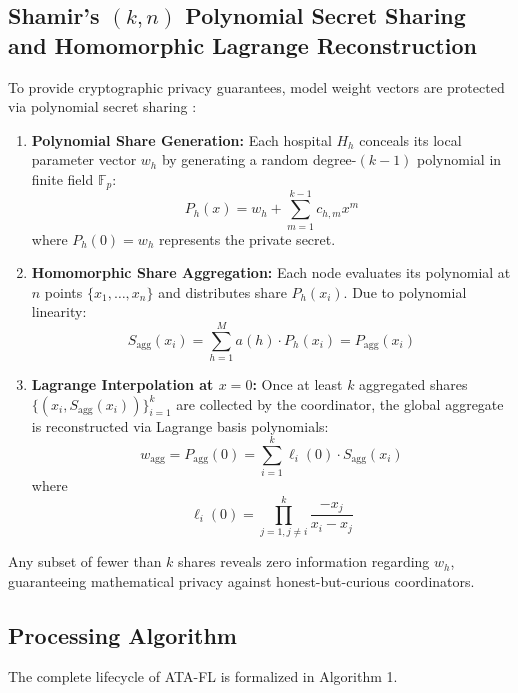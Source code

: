 \documentclass[conference]{IEEEtran}
\begin{document}
\subsection{Shamir's $(k, n)$ Polynomial Secret Sharing and Homomorphic Lagrange Reconstruction}
To provide cryptographic privacy guarantees, model weight vectors are protected via polynomial secret sharing \cite{shamir1979share}:
\begin{enumerate}
    \item \textbf{Polynomial Share Generation:} Each hospital $H_h$ conceals its local parameter vector $w_h$ by generating a random degree-$(k-1)$ polynomial in finite field $\mathbb{F}_p$:
    \begin{equation}
    P_h(x) = w_h + \sum_{m=1}^{k-1} c_{h, m} x^m
    \end{equation}
    where $P_h(0) = w_h$ represents the private secret.
    \item \textbf{Homomorphic Share Aggregation:} Each node evaluates its polynomial at $n$ points $\{x_1, \dots, x_n\}$ and distributes share $P_h(x_i)$. Due to polynomial linearity:
    \begin{equation}
    S_{\text{agg}}(x_i) = \sum_{h=1}^M a(h) \cdot P_h(x_i) = P_{\text{agg}}(x_i)
    \end{equation}
    \item \textbf{Lagrange Interpolation at $x = 0$:} Once at least $k$ aggregated shares $\{ (x_i, S_{\text{agg}}(x_i)) \}_{i=1}^k$ are collected by the coordinator, the global aggregate is reconstructed via Lagrange basis polynomials:
    \begin{equation}
    w_{\text{agg}} = P_{\text{agg}}(0) = \sum_{i=1}^k \ell_i(0) \cdot S_{\text{agg}}(x_i)
    \end{equation}
    where
    \begin{equation}
    \ell_i(0) = \prod_{j=1, j \neq i}^k \frac{-x_j}{x_i - x_j}
    \end{equation}
\end{enumerate}

Any subset of fewer than $k$ shares reveals zero information regarding $w_h$, guaranteeing mathematical privacy against honest-but-curious coordinators.

\subsection{Processing Algorithm}
The complete lifecycle of ATA-FL is formalized in Algorithm 1.
\end{document}
